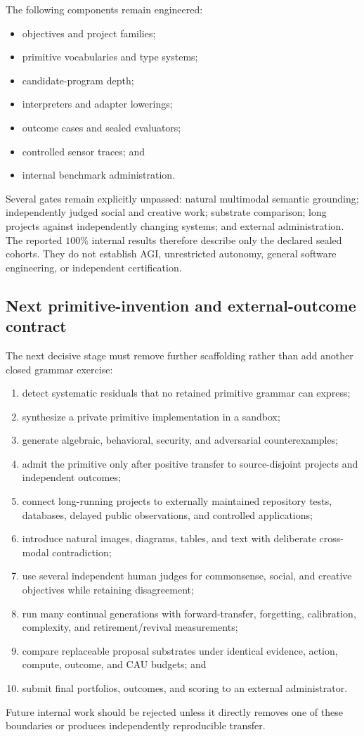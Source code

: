 The following components remain engineered:
\begin{itemize}
  \item objectives and project families;
  \item primitive vocabularies and type systems;
  \item candidate-program depth;
  \item interpreters and adapter lowerings;
  \item outcome cases and sealed evaluators;
  \item controlled sensor traces; and
  \item internal benchmark administration.
\end{itemize}

Several gates remain explicitly unpassed: natural multimodal semantic
grounding; independently judged social and creative work; substrate
comparison; long projects against independently changing systems; and external
administration.  The reported $100\%$ internal results therefore describe only
the declared sealed cohorts.  They do not establish AGI, unrestricted
autonomy, general software engineering, or independent certification.


\subsection{Next primitive-invention and external-outcome contract}
\label{subsec:arena-v5-contract}

The next decisive stage must remove further scaffolding rather than add another
closed grammar exercise:
\begin{enumerate}
  \item detect systematic residuals that no retained primitive grammar can
        express;
  \item synthesize a private primitive implementation in a sandbox;
  \item generate algebraic, behavioral, security, and adversarial
        counterexamples;
  \item admit the primitive only after positive transfer to source-disjoint
        projects and independent outcomes;
  \item connect long-running projects to externally maintained repository
        tests, databases, delayed public observations, and controlled
        applications;
  \item introduce natural images, diagrams, tables, and text with deliberate
        cross-modal contradiction;
  \item use several independent human judges for commonsense, social, and
        creative objectives while retaining disagreement;
  \item run many continual generations with forward-transfer, forgetting,
        calibration, complexity, and retirement/revival measurements;
  \item compare replaceable proposal substrates under identical evidence,
        action, compute, outcome, and CAU budgets; and
  \item submit final portfolios, outcomes, and scoring to an external
        administrator.
\end{enumerate}

Future internal work should be rejected unless it directly removes one of
these boundaries or produces independently reproducible transfer.
